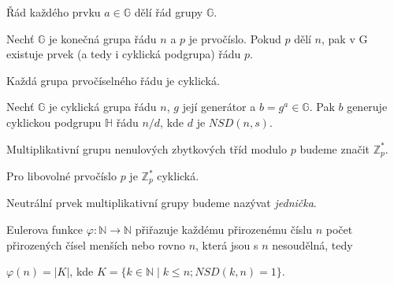 \documentclass[
  program=infoi,
  biblatex,
  figures=false,
  glossaries,
  index
]{kidiplom}
\begin{document}
    \begin{consequence}
        Řád každého prvku $a \in \mathbb{G}$ dělí řád grupy $\mathbb{G}$.
    \end{consequence}


    \begin{theorem}

        Nechť $\mathbb{G}$ je konečná grupa řádu $n$ a $p$ je prvočíslo.
        Pokud $p$ dělí $n$, pak v G existuje prvek (a tedy i cyklická podgrupa) řádu $p$.

    \end{theorem}

    \begin{consequence}\label{con:prime-cyclic}
        Každá grupa prvočíselného řádu je cyklická.
    \end{consequence}


    \begin{theorem}\label{the:subgroups}
        Nechť $\mathbb{G}$ je cyklická grupa řádu $n$, $g$ její generátor a $b = g^a \in \mathbb{G}$.
        Pak $b$ generuje cyklickou podgrupu $\mathbb{H}$ řádu $n/d$, kde $d$ je $NSD(n,s)$.
    \end{theorem}



    \begin{definition}\label{def:Z*p}
        Multiplikativní grupu nenulových zbytkových tříd modulo $p$ budeme značit $\mathbb{Z}^*_p$.
    \end{definition}

    \begin{theorem}
        Pro libovolné prvočíslo $p$ je $\mathbb{Z}^*_p$ cyklická.
    \end{theorem}

    \begin{definition}
        Neutrální prvek multiplikativní grupy budeme nazývat \emph{jednička}.
    \end{definition}




    \begin{definition}
        Eulerova funkce $\varphi: \mathbb{N} \rightarrow \mathbb{N}$ přiřazuje každému přirozenému číslu $n$
        počet přirozených čísel menších nebo rovno $n$, která jsou s $n$ nesoudělná, tedy

        \begin{center}
            $\varphi(n) = |K|$, kde $K = \{k \in \mathbb{N} \mid k \leq n; NSD(k,n)=1\}$.
        \end{center}

    \end{definition}
\end{document}
